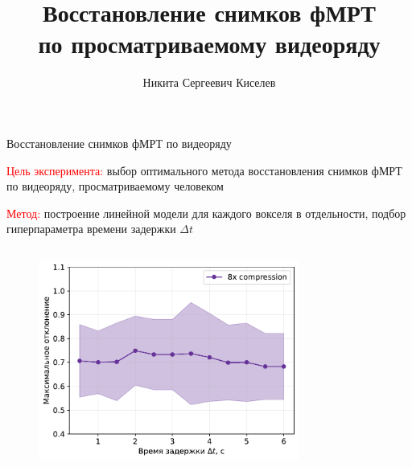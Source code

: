 \documentclass[10pt]{beamer}
\title[\hbox to 56mm{Восстановление снимков фМРТ}]{Восстановление снимков фМРТ \\ по просматриваемому видеоряду}
\author[Н.\,С.~Киселев]{Никита Сергеевич Киселев}
\institute{Московский физико-технический институт}
\date{\footnotesize
\par\smallskip\emph{Курс:} Автоматизация научных исследований\par/Группа 003
\par\smallskip\emph{Эксперт:} А.\,В.~Грабовой
\par\bigskip\small 2023}
\begin{document}
\begin{frame}{Восстановление снимков фМРТ по видеоряду}

\textcolor{red}{Цель эксперимента:} выбор оптимального метода восстановления снимков фМРТ по видеоряду,
просматриваемому человеком

\textcolor{red}{Метод:} построение линейной модели для каждого вокселя в отдельности,
подбор гиперпараметра времени задержки $\Delta t$

\vspace{-0.5cm}

\begin{columns}[c]
        \begin{figure}[h!]
            \includegraphics[width=1.0\textwidth]{subs_deviation_dt.pdf}
        \end{figure}
        \begin{figure}[h!]
            \centering

\end{figure}
\end{columns}
\end{frame}
\end{document}
